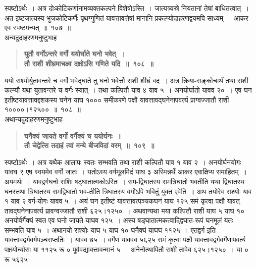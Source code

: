 \documentclass[11pt, openany]{book}
\begin{document}
\begin{sloppypar}
स्पष्टोऽर्थः~। अत्र दोःकोटिकर्णानामव्यक्तकल्पने विशेषोऽस्ति~। जात्यत्र्यस्रे नियतानां तेषां बाधितत्वात्~। अत इष्टजात्यस्य भुजकोटिकर्णैः पृथग्गुणितं यावत्तावत्तेषां मानानि प्रकल्प्योदाहरणद्वयमपि साध्यम्~। आकर एव स्पष्टमन्यत्~॥~१०७~॥\\

{\small अन्यदुदाहरणमनुष्टुभाह\textendash }

 \label{7.108}
\begin{quote}
{\large \textbf{{\color{purple}युतौ वर्गोऽन्तरे वर्गो ययोर्घाते घनो भवेत्~।\\
तौ राशी शीघ्रमाचक्ष्व दक्षोऽसि गणिते यदि~॥~१०८~॥}}}
\end{quote}

ययो राश्योर्युतावन्तरे च वर्गो भवेद्घाते तु घनो भवेत्तौ राशी शीघ्रं वद~। अत्र क्रिया-सङ्कोचार्थं तथा राशी कल्प्यौ यथा युतावन्तरे च वर्गः स्यात्~। तथा कल्पितौ याव ४ याव ५~। अनयोर्घातो यावव २०~। एष घन इतीष्टयावत्तावद्दशकस्य घनेन याघ १००० समीकरणे पक्षौ यावत्तावद्घनेनापवर्त्य प्राग्वज्जातौ राशी १००००।१२५००~॥~१०८~॥\\

{\small अथान्यदुदाहरणमनुष्टुभाह\textendash }

 \label{7.109}
\begin{quote}
{\large \textbf{{\color{purple}घनैक्यं जायते वर्गो वर्गैक्यं च ययोर्घनः~।\\
तौ चेद्वेत्सि तदाहं त्वां मन्ये बीजविदां वरम्~॥~१०९~॥}}}
\end{quote}

स्पष्टोऽर्थः~। अत्र यथैक आलापः स्वतः सम्भवति तथा राशी कल्पितौ याव १ याव २~। अनयोर्घनयोगः यावघ ९ एष स्वयमेव वर्गो जातः~। यतोऽस्य वर्गमूलमिदं याघ ३ अस्मिन्नर्थे आकर एवाक्षिप्य समाहितम्~। अयमर्थः~। यावद्वर्गघनो राशिः षट्घातात्मकोऽस्ति~। सम-द्विघातस्य समत्रिघातो भवतीति यथा द्विघातस्य घनस्तथा त्रिघातस्य समद्विघातो भव-तीति त्रिघातस्य वर्गोऽपि भवितुं युक्त एवेति~। अथ तयोरेव राश्योः याव १ याव २ वर्ग-योगः यावव ५~। अयं घन इतीष्टं यावत्तावत्पञ्चकघनं याघ १२५ समं कृत्वा पक्षौ यावत् तावद्घनेनापवर्त्य प्रावग्वज्जातौ राशी ६२५।१२५०~। अथवान्यथा मया कल्पितौ राशी याघ ५ याघ १० अनयोर्वर्गैक्यं स्वत एव घनो जायते याघव १२५~। अस्य षड्घातात्मकत्वाद्द्विघात-रूपं घनमूलं यतः सम्भवति याव ५~। अथानयो राश्योः याघ ५ याघ १० घनैक्यं याघघ ११२५~। एतद्वर्ग इति यावत्तावद्वर्गवर्गपञ्चसप्ततिः~। यावव ७५~। वर्गेण याववव ५६२५ समं कृत्वा पक्षौ यावत्तावद्वर्गवर्गेणापवर्त्य पक्षयोर्न्यासः या ११२५ रू ० पूर्ववद्यावत्तावन्मानं ५~। अनेनोत्थापितौ राशी तावेव ६२५।१२५०~। या ० रू ५६२५
\end{sloppypar}
\end{document}
